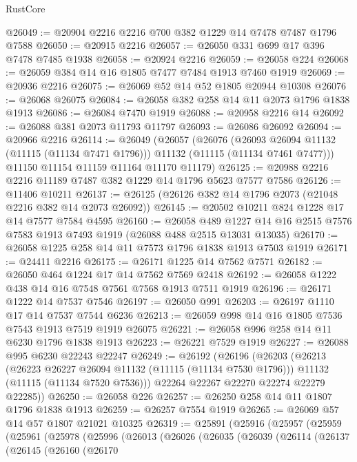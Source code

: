 \begin{lexlean}{RustCore}
\begin{coremodule}
@26049 := @20904 @2216 @2216 @700 @382 @1229 @14 @7478 @7487 @1796 @7588
@26050 := @20915 @2216
@26057 := @26050 @331 @699 @17 @396 @7478 @7485 @1938
@26058 := @20924 @2216
@26059 := @26058 @224
@26068 := @26059 @384 @14 @16 @1805 @7477 @7484 @1913 @7460 @1919
@26069 := @20936 @2216
@26075 := @26069 @52 @14 @52 @1805 @20944 @10308
@26076 := @26068 @26075
@26084 := @26058 @382 @258 @14 @11 @2073 @1796 @1838 @1913
@26086 := @26084 @7470 @1919
@26088 := @20958 @2216 @14
@26092 := @26088 @381 @2073 @11793 @11797
@26093 := @26086 @26092
@26094 := @20966 @2216
@26114 := @26049
    (@26057
      (@26076
        (@26093 @26094 @11132 (@11115 (@11134 @7471 @1796)))
        @11132
        (@11115 (@11134 @7461 @7477)))
      @11150
      @11154
      @11159
      @11164
      @11170
      @11179)
@26125 := @20988 @2216 @2216 @11189 @7487 @382 @1229 @14 @1796 @5623 @7577 @7586
@26126 := @11406 @10211
@26137 := @26125 (@26126 @382 @14 @1796 @2073 (@21048 @2216 @382 @14 @2073 @26092))
@26145 := @20502 @10211 @824 @1228 @17 @14 @7577 @7584 @4595
@26160 := @26058
    @489
    @1227
    @14
    @16
    @2515
    @7576
    @7583
    @1913
    @7493
    @1919
    (@26088 @488 @2515 @13031 @13035)
@26170 := @26058 @1225 @258 @14 @11 @7573 @1796 @1838 @1913 @7503 @1919
@26171 := @24411 @2216
@26175 := @26171 @1225 @14 @7562 @7571
@26182 := @26050 @464 @1224 @17 @14 @7562 @7569 @2418
@26192 := @26058 @1222 @438 @14 @16 @7548 @7561 @7568 @1913 @7511 @1919
@26196 := @26171 @1222 @14 @7537 @7546
@26197 := @26050 @991
@26203 := @26197 @1110 @17 @14 @7537 @7544 @6236
@26213 := @26059 @998 @14 @16 @1805 @7536 @7543 @1913 @7519 @1919 @26075
@26221 := @26058 @996 @258 @14 @11 @6230 @1796 @1838 @1913
@26223 := @26221 @7529 @1919
@26227 := @26088 @995 @6230 @22243 @22247
@26249 := @26192
    (@26196
      (@26203
        (@26213
          (@26223 @26227 @26094 @11132 (@11115 (@11134 @7530 @1796)))
          @11132
          (@11115 (@11134 @7520 @7536)))
        @22264
        @22267
        @22270
        @22274
        @22279
        @22285))
@26250 := @26058 @226
@26257 := @26250 @258 @14 @11 @1807 @1796 @1838 @1913
@26259 := @26257 @7554 @1919
@26265 := @26069 @57 @14 @57 @1807 @21021 @10325
@26319 := @25891
    (@25916
      (@25957
        (@25959
          (@25961
            (@25978
              (@25996
                (@26013
                  (@26026
                    (@26035
                      (@26039
                        (@26114
                          (@26137
                            (@26145
                              (@26160
                                (@26170

\end{coremodule}
\end{lexlean}
